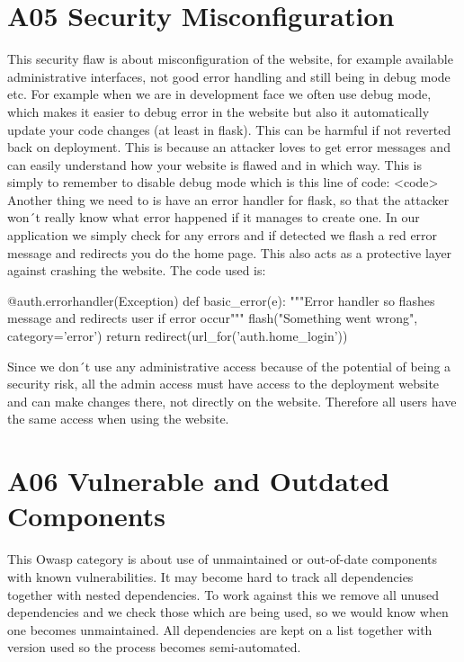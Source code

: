 \section{A05 Security Misconfiguration}

This security flaw is about misconfiguration of the website, for example available administrative interfaces, not good error handling and still being in debug mode etc.
For example when we are in development face we often use debug mode, which makes it easier to debug error in the website but also it automatically update your code changes (at least in flask). This can be harmful if not reverted back on deployment. This is because an attacker loves to get error messages and can easily understand how your website is flawed and in which way.  This is simply to remember to disable debug mode which is this line of code: <code>
Another thing we need to is have an error handler for flask, so that the attacker won´t really know what error happened if it manages to create one. In our application we simply check for any errors and if detected we flash a red error message and redirects you do the home page. This also acts as a protective layer against crashing the website. The code used is:

\begin{python}
@auth.errorhandler(Exception)
def basic_error(e):
    """Error handler so flashes message
    and redirects user if error occur"""
    flash("Something went wrong", category='error')
    return redirect(url_for('auth.home_login'))
\end{python}

Since we don´t use any administrative access because of the potential of being a security risk, all the admin access must have access to the deployment website and can make changes there, not directly on the website. Therefore all users have the same access when using the website.

\section{A06 Vulnerable and Outdated Components}

This Owasp category is about use of unmaintained or out-of-date components with known vulnerabilities. It may become hard to track all dependencies together with nested dependencies.
To work against this we remove all unused dependencies and we check those which are being used, so we would know when one becomes unmaintained. All dependencies are kept on a list together with version used so the process becomes semi-automated.

